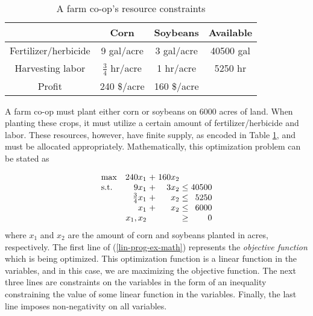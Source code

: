 \documentclass{article}
\begin{document}
\begin{table}[h!]
    \centering
    \begin{tabular}{|c|c|c|c|}
        \hline
        & \textbf{Corn} & \textbf{Soybeans} & \textbf{Available} \\
        \hline
        Fertilizer/herbicide & 9 gal/acre & 3 gal/acre & 40500 gal \\
        Harvesting labor & $\frac{3}{4}$ hr/acre & 1 hr/acre & 5250 hr \\
        \hline
        Profit & 240 \$/acre & 160 \$/acre & \\ 
        \hline
    \end{tabular}
    \caption{A farm co-op's resource constraints}
    \label{lin-prog-ex-table}
\end{table}

A farm co-op must plant either corn or soybeans on 6000 acres of land. When planting these crops, it must utilize a certain amount of fertilizer/herbicide and labor. These resources, however, have finite supply, as encoded in Table \ref{lin-prog-ex-table}, and must be allocated appropriately. Mathematically, this optimization problem can be stated as

\begin{equation}
\setlength\arraycolsep{1.5pt}
  \begin{array}{l@{\quad} r c r c r}
    \max          & 240x_1 & + &         160x_2 &      &    \\
    \mathrm{s.t.} &   9x_1 & + &           3x_2 & \leq & 40500 \\
                  &    \frac{3}{4}x_1 & + &           x_2 & \leq &  5250 \\
                  & x_1 & + & x_2 & \leq & 6000 \\
                  &    x_1, x_2 &  & & \geq &  0 \\
  \end{array}
  \label{lin-prog-ex-math}
\end{equation}
where $x_1$ and $x_2$ are the amount of corn and soybeans planted in acres, respectively.
The first line of (\ref{lin-prog-ex-math}) represents the \textit{objective function} which is being optimized. This optimization function is a linear function in the variables, and in this case, we are maximizing the objective function. The next three lines are constraints on the variables in the form of an inequality constraining the value of some linear function in the variables. Finally, the last line imposes non-negativity on all variables.
\end{document}
